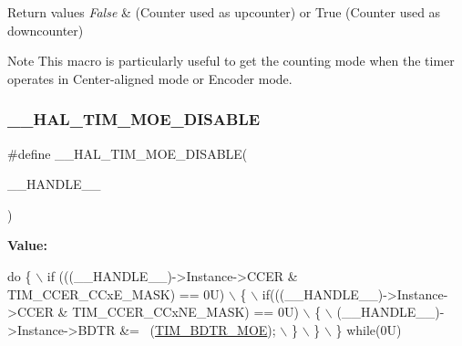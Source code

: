 \begin{DoxyRetVals}{Return values}
{\em False} & (Counter used as upcounter) or True (Counter used as downcounter) \\
\hline
\end{DoxyRetVals}
\begin{DoxyNote}{Note}
This macro is particularly useful to get the counting mode when the timer operates in Center-\/aligned mode or Encoder mode. 
\end{DoxyNote}
\mbox{\label{group___t_i_m___exported___macros_ga69d63e147faeca8909e9679f684c0325}} 
\subsubsection{\texorpdfstring{\+\_\+\+\_\+\+H\+A\+L\+\_\+\+T\+I\+M\+\_\+\+M\+O\+E\+\_\+\+D\+I\+S\+A\+B\+LE}{\_\_HAL\_TIM\_MOE\_DISABLE}}
{\footnotesize\ttfamily \#define \+\_\+\+\_\+\+H\+A\+L\+\_\+\+T\+I\+M\+\_\+\+M\+O\+E\+\_\+\+D\+I\+S\+A\+B\+LE(\begin{DoxyParamCaption}\item[{}]{\+\_\+\+\_\+\+H\+A\+N\+D\+L\+E\+\_\+\+\_\+ }\end{DoxyParamCaption})}

{\bfseries Value\+:}
\begin{DoxyCode}
\textcolor{keywordflow}{do} \{ \(\backslash\)
                          if (((\_\_HANDLE\_\_)->Instance->CCER & TIM\_CCER\_CCxE\_MASK) == 0U) \(\backslash\)
                          \{ \(\backslash\)
                            if(((\_\_HANDLE\_\_)->Instance->CCER & TIM\_CCER\_CCxNE\_MASK) == 0U) \(\backslash\)
                            \{ \(\backslash\)
                              (\_\_HANDLE\_\_)->Instance->BDTR &= ~(\mbox{\hyperlink{group___peripheral___registers___bits___definition_ga277a096614829feba2d0a4fbb7d3dffc}{TIM\_BDTR\_MOE}}); \(\backslash\)
                            \} \(\backslash\)
                          \} \(\backslash\)
                        \} \textcolor{keywordflow}{while}(0U)
\end{DoxyCode}


